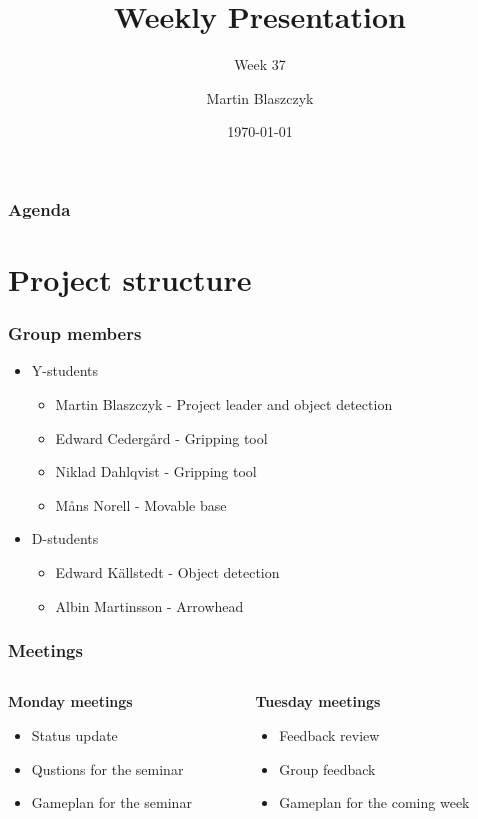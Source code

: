 \documentclass{beamer}
\title{Weekly Presentation}
\subtitle{Week 37}
\author{Martin Blaszczyk}
\institute{Luleå University of Technology}
\date{\today}
\begin{document}
\begin{frame}
    \titlepage
\end{frame}

\begin{frame}
    \frametitle{Agenda}
    \tableofcontents
\end{frame}

\section{Project structure}
\begin{frame}
    \frametitle{Group members}
    \begin{itemize}
        \item Y-students
        \begin{itemize}
            \item Martin Blaszczyk - Project leader and object detection
            \item Edward Cedergård - Gripping tool
            \item Niklad Dahlqvist - Gripping tool
            \item Måns Norell - Movable base
        \end{itemize}
        \item D-students
        \begin{itemize}
            \item Edward Källstedt - Object detection
            \item Albin Martinsson - Arrowhead 
        \end{itemize}  
    \end{itemize}
\end{frame}

\begin{frame}
    \frametitle{Meetings}

    \begin{columns}
        \begin{column}[]{0.5\textwidth}
            \textbf{Monday meetings}
            \begin{itemize}
                \item Status update
                \item Qustions for the seminar
                \item Gameplan for the seminar
            \end{itemize}
        \end{column}
        \begin{column}[]{.5\textwidth}
            \textbf{Tuesday meetings}
            \begin{itemize}
                \item Feedback review
                \item Group feedback
                \item Gameplan for the coming week
            \end{itemize}
        \end{column}

    \end{columns}
\end{frame}
\end{document}
